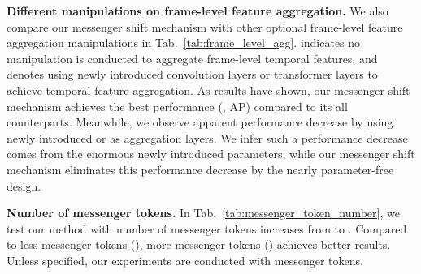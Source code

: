 \documentclass[10pt,twocolumn,letterpaper]{article}
\begin{document}
\noindent\textbf{Different manipulations on frame-level feature aggregation.}
We also compare our messenger shift mechanism with other optional frame-level feature aggregation manipulations in Tab.~\ref{tab:frame_level_agg}.
 indicates no manipulation is conducted to aggregate frame-level temporal features.
 and  denotes using newly introduced convolution layers or transformer layers to achieve temporal feature aggregation.
As results have shown, our messenger shift mechanism achieves the best performance (\ie,  AP) compared to its all counterparts.
Meanwhile, we observe apparent performance decrease by using newly introduced  or  as aggregation layers.
We infer such a performance decrease comes from the enormous newly introduced parameters, while our messenger shift mechanism eliminates this performance decrease by the nearly parameter-free design.

\noindent\textbf{Number of messenger tokens.}
In Tab.~\ref{tab:messenger_token_number}, we test our method with number of messenger tokens increases from  to .
Compared to less messenger tokens (), more messenger tokens () achieves better results.
Unless specified, our experiments are conducted with  messenger tokens.
\end{document}
